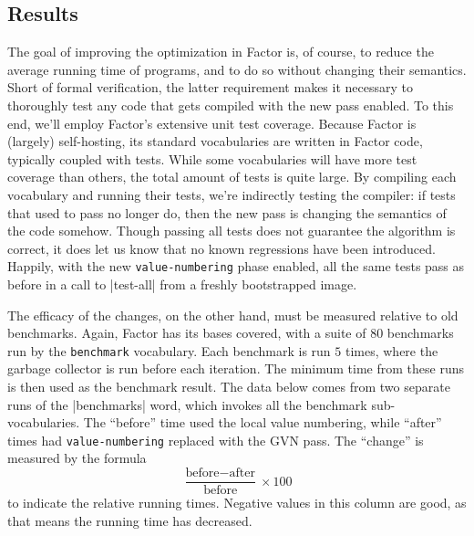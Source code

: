 \subsection{Results}\label{sec:vn:results}

The goal of improving the optimization in Factor is, of course, to reduce the
average running time of programs, and to do so without changing their
semantics.  Short of formal verification, the latter requirement makes it
necessary to thoroughly test any code that gets compiled with the new pass
enabled.  To this end, we'll employ Factor's extensive unit test coverage.
Because Factor is (largely) self-hosting, its standard vocabularies are written
in Factor code, typically coupled with tests.  While some vocabularies will
have more test coverage than others, the total amount of tests is quite large.
By compiling each vocabulary and running their tests, we're indirectly testing
the compiler: if tests that used to pass no longer do, then the new pass is
changing the semantics of the code somehow.  Though passing all tests does not
guarantee the algorithm is correct, it does let us know that no known
regressions have been introduced.  Happily, with the new
\Verb|value-numbering| phase enabled, all the same tests pass as before in a
call to \factor|test-all| from a freshly bootstrapped image.

The efficacy of the changes, on the other hand, must be measured relative to
old benchmarks.  Again, Factor has its bases covered, with a suite of $80$
benchmarks run by the \Verb|benchmark| vocabulary.  Each benchmark is run $5$
times, where the garbage collector is run before each iteration.  The minimum
time from these runs is then used as the benchmark result.  The data below
comes from two separate runs of the \factor|benchmarks| word, which invokes all
the benchmark sub-vocabularies.  The ``before'' time used the local value
numbering, while ``after'' times had \Verb|value-numbering| replaced with the
\gls{GVN} pass.  The ``change'' is measured by the formula
%
$$\frac{\text{before} - \text{after}}{\text{before}} \times 100$$
%
to indicate the relative running times.  Negative values in this column are
good, as that means the running time has decreased.


